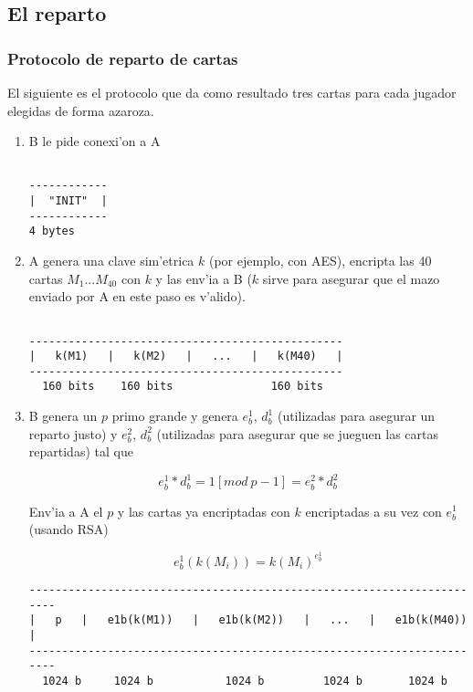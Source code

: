 \subsection{El reparto}
\subsubsection{Protocolo de reparto de cartas}
El siguiente es el protocolo que da como resultado tres cartas para cada jugador elegidas de forma azaroza.

\begin{enumerate}

\item B le pide conexi'on a A

\begin{verbatim}

------------
|  "INIT"  |
------------
4 bytes

\end{verbatim}




\item A genera una clave sim'etrica $k$ (por ejemplo, con AES), encripta las 40 cartas $M_1...M_40$ con $k$ y las env'ia a B ($k$ sirve para asegurar que el mazo enviado por A en este paso es v'alido).

\begin{verbatim}

------------------------------------------------
|   k(M1)   |   k(M2)   |   ...   |   k(M40)   |
------------------------------------------------
  160 bits    160 bits               160 bits

\end{verbatim}

  


\item B genera un $p$ primo grande y genera $e^1_b$, $d^1_b$ (utilizadas para asegurar un reparto justo) y  $e^2_b$, $d^2_b$ (utilizadas para asegurar que se jueguen las cartas repartidas) tal que

$$	e^1_b * d^1_b = 1 [mod\ p-1] = e^2_b * d^2_b $$

Env'ia a A el $p$ y las cartas ya encriptadas con $k$ encriptadas a su vez con $e^1_b$ (usando RSA)

$$	e^1_b(k(M_i)) = k(M_i)^{e^1_b} $$
	

\begin{verbatim}
-----------------------------------------------------------------------
|   p   |   e1b(k(M1))   |   e1b(k(M2))   |   ...   |   e1b(k(M40))   |
-----------------------------------------------------------------------
  1024 b     1024 b           1024 b         1024 b       1024 b       
\end{verbatim}



\end{enumerate}
